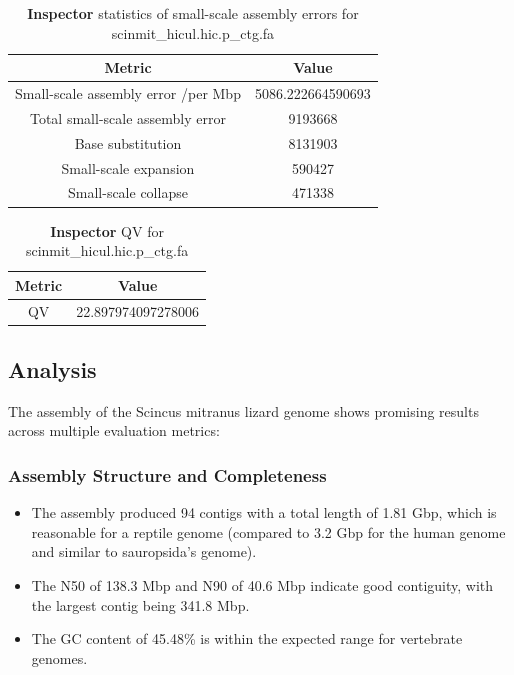 \documentclass[12pt]{article}
\begin{document}
\begin{table}[h!]
    \begin{center}
    \begin{tabular}{ |c|c| }
        \hline
        Metric & Value \\
        \hline
        Small-scale assembly error /per Mbp & 5086.222664590693 \\
        Total small-scale assembly error & 9193668 \\
        Base substitution & 8131903 \\
        Small-scale expansion & 590427 \\
        Small-scale collapse & 471338 \\
        \hline
    \end{tabular}
    \caption{\textbf{Inspector} statistics of small-scale assembly errors for scinmit\_hicul.hic.p\_ctg.fa}
    \label{tab:inspector_scinmit_hicul_small_scale_errors}
    \end{center}
    \end{table}

\begin{table}[h!]
    \begin{center}
    \begin{tabular}{ |c|c| }
        \hline
        Metric & Value \\
        \hline
        QV & 22.897974097278006 \\
        \hline
    \end{tabular}
    \caption{\textbf{Inspector} QV for scinmit\_hicul.hic.p\_ctg.fa}
    \label{tab:inspector_scinmit_hicul_qv}
    \end{center}
    \end{table}

\subsection{Analysis}

The assembly of the Scincus mitranus lizard genome shows promising results across multiple evaluation metrics:

\subsubsection{Assembly Structure and Completeness}
\begin{itemize}
    \item The assembly produced 94 contigs with a total length of 1.81 Gbp, which is reasonable for a reptile genome (compared to 3.2 Gbp for the human genome and similar to sauropsida's genome).
    \item The N50 of 138.3 Mbp and N90 of 40.6 Mbp indicate good contiguity, with the largest contig being 341.8 Mbp.
    \item The GC content of 45.48\% is within the expected range for vertebrate genomes.
\end{itemize}
\end{document}
